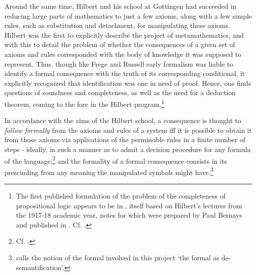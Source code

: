 	Around the same time, Hilbert and his school at Gottingen had succeeded in reducing large parts of mathematics to just a few axioms, along with a few simple rules, such as substitution and detachment, for manipulating these axioms. Hilbert was the first to explicitly describe the project of metamathematics, and with this to detail the problem of whether the consequences of a given set of axioms and rules corresponded with the body of knowledge it was supposed to represent. Thus, though like Frege and Russell early formalism was liable to identify a formal consequence with the truth of its corresponding conditional, it explicitly recognized that identification was one in need of proof. Hence, one finds questions of soundness and completeness, as well as the need for a deduction theorem, coming to the fore in the Hilbert program.\footnote{The first published formulation of the problem of the completeness of propositional logic appears to be in \cite{Hilbert1928}, itself based on Hilbert's lectures from the 1917-18 academic year, notes for which were prepared by Paul Bernays and published in \cite{Ewald2011}. Cf. \cite{Franks2010}.}
	
	In accordance with the aims of the Hilbert school, a consequence is thought to \textit{follow formally} from the axioms and rules of a system iff it is possible to obtain it from those axioms via applications of the permissible rules in a finite number of steps - ideally, in such a manner as to admit a decision procedure for any formula of the language;\footnote{Cf. \cite[354]{Franks2010}.} and the formality of a formal consequence consists in its prescinding from any meaning the manipulated symbols might have.\footnote{\cite{DutilhNovaes2011} calls the notion of the formal involved in this project `the formal as de-semantification'.}
	
	
